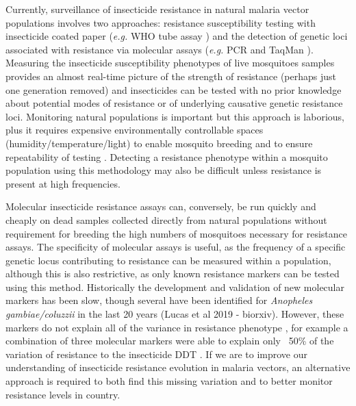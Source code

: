 \documentclass[a4paper,11pt,abstracton,hidelinks]{scrartcl}
\begin{document}
Currently, surveillance of insecticide resistance in natural malaria vector populations involves two approaches:
%
resistance susceptibility testing with insecticide coated paper (\textit{e.g.} WHO tube assay \cite{world2016test}) and the detection of genetic loci associated with resistance via molecular assays (\textit{e.g.} PCR \cite{Ranson2000} and TaqMan \cite{bass2007}).
%
Measuring the insecticide susceptibility phenotypes of live mosquitoes samples provides an almost real-time picture of the strength of resistance (perhaps just one generation removed) and insecticides can be tested with no prior knowledge about potential modes of resistance or of underlying causative genetic resistance loci.
%
Monitoring natural populations is important but this approach is laborious, plus it requires expensive environmentally controllable spaces (humidity/temperature/light) to enable mosquito breeding and to ensure repeatability of testing \cite{kleinschmidt2018}.
%
Detecting a resistance phenotype within a mosquito population using this methodology may also be difficult unless resistance is present at high frequencies.


Molecular insecticide resistance assays can, conversely, be run quickly and cheaply on dead samples collected directly from natural populations without requirement for breeding the high numbers of mosquitoes necessary for resistance assays.
%
The specificity of molecular assays is useful, as the frequency of a specific genetic locus contributing to resistance can be measured within a population, although this is also restrictive, as only known resistance markers can be tested using this method.
%
Historically the development and validation of new molecular markers has been slow, though several have been identified for \textit{Anopheles gambiae/coluzzii} in the last 20 years \cite{du2005, jones2012, martinez1998, mitchell2014, ranson2000, riveron2014, weetman2018, weill2003} (Lucas et al 2019 - biorxiv).
%
However, these markers do not explain all of the variance in resistance phenotype \cite{donnelly2009, donnelly2016}, for example a combination of three molecular markers were able to explain only ~50\% of the variation of resistance to the insecticide DDT \cite{mitchell2014}.
%
If we are to improve our understanding of insecticide resistance evolution in malaria vectors, an alternative approach is required to both find this missing variation and to better monitor resistance levels in country. 
\end{document}
